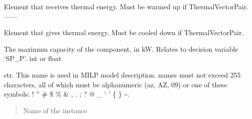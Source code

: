 \documentclass[letterpaper,10pt,english]{sphinxmanual}
\begin{document}
\begin{fulllineitems}
\begin{fulllineitems}
\end{fulllineitems}


\begin{fulllineitems}
\label{\detokenize{generated/tamos.production.AbsHP:tamos.production.AbsHP.energy_sink}}
\pysigstartsignatures
{}
\pysigstopsignatures
\sphinxAtStartPar
Element that receives thermal energy.
Must be warmed up if ThermalVectorPair.                ——\sphinxhyphen{}

\end{fulllineitems}


\begin{fulllineitems}
\label{\detokenize{generated/tamos.production.AbsHP:tamos.production.AbsHP.energy_source}}
\pysigstartsignatures
{}
\pysigstopsignatures
\sphinxAtStartPar
Element that gives thermal energy.
Must be cooled down if ThermalVectorPair.

\end{fulllineitems}


\begin{fulllineitems}
\label{\detokenize{generated/tamos.production.AbsHP:tamos.production.AbsHP.given_sizing}}
\pysigstartsignatures
{}
\pysigstopsignatures
\sphinxAtStartPar
The maximum capacity of the component, in kW.
Relates to decision variable ‘SP\_P’.
int or float

\end{fulllineitems}


\begin{fulllineitems}
\label{\detokenize{generated/tamos.production.AbsHP:tamos.production.AbsHP.name}}
\pysigstartsignatures
{}
\pysigstopsignatures
\sphinxAtStartPar
str.
This name is used in MILP model description.
names must not exceed 255 characters,
all of which must be alphanumeric (a\sphinxhyphen{}z, A\sphinxhyphen{}Z, 0\sphinxhyphen{}9) or one of these symbols:
! ” \# \$ \% \& , . ; ? @ \_ ‘ ’ \{ \} \textasciitilde{}.
\begin{quote}\begin{description}
\sphinxAtStartPar
Name of the instance


\end{description}
\end{quote}
\end{fulllineitems}
\end{fulllineitems}
\end{document}
